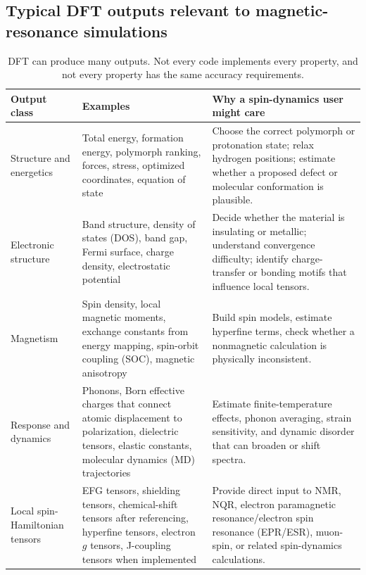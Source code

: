\documentclass[11pt]{article}
\begin{document}
\subsection{Typical DFT outputs relevant to magnetic-resonance simulations}

\begin{table}[H]
\centering
\small
\begin{tabularx}{\textwidth}{L{0.22\textwidth}Y Y}
\toprule
\textbf{Output class} & \textbf{Examples} & \textbf{Why a spin-dynamics user might care} \\
\midrule
Structure and energetics & Total energy, formation energy, polymorph ranking, forces, stress, optimized coordinates, equation of state & Choose the correct polymorph or protonation state; relax hydrogen positions; estimate whether a proposed defect or molecular conformation is plausible. \\
Electronic structure & Band structure, density of states (DOS), band gap, Fermi surface, charge density, electrostatic potential & Decide whether the material is insulating or metallic; understand convergence difficulty; identify charge-transfer or bonding motifs that influence local tensors. \\
Magnetism & Spin density, local magnetic moments, exchange constants from energy mapping, spin-orbit coupling (SOC), magnetic anisotropy & Build spin models, estimate hyperfine terms, check whether a nonmagnetic calculation is physically inconsistent. \\
Response and dynamics & Phonons, Born effective charges that connect atomic displacement to polarization, dielectric tensors, elastic constants, molecular dynamics (MD) trajectories & Estimate finite-temperature effects, phonon averaging, strain sensitivity, and dynamic disorder that can broaden or shift spectra. \\
Local spin-Hamiltonian tensors & EFG tensors, shielding tensors, chemical-shift tensors after referencing, hyperfine tensors, electron $g$ tensors, J-coupling tensors when implemented & Provide direct input to NMR, NQR, electron paramagnetic resonance/electron spin resonance (EPR/ESR), muon-spin, or related spin-dynamics calculations. \\
\bottomrule
\end{tabularx}
\caption{DFT can produce many outputs.  Not every code implements every property, and not every property has the same accuracy requirements.}
\label{tab:dft-outputs}
\end{table}
\end{document}
